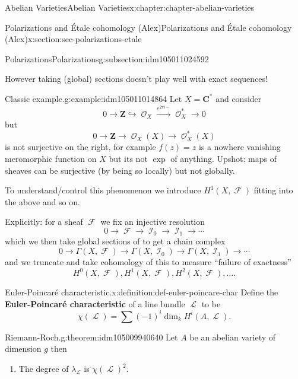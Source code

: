 \documentclass[oneside,10pt,]{book}
\newcommand{\terminology}[1]{\textbf{#1}}
\numberwithin{equation}{section}
\newcommand{\sheaf}[1]{\operatorname{\mathcal{#1}}}
\newcommand{\ZZ}{\mathbf{Z}}
\newcommand{\CC}{\mathbf{C}}
\begin{document}
\begin{chapterptx}{Abelian Varieties}{}{Abelian Varieties}{}{}{x:chapter:chapter-abelian-varieties}
\begin{sectionptx}{Polarizations and Étale cohomology (Alex)}{}{Polarizations and Étale cohomology (Alex)}{}{}{x:section:sec-polarizations-etale}
\begin{subsectionptx}{Polarizations}{}{Polarizations}{}{}{g:subsection:idm105011024592}
\par
However taking (global) sections doesn't play well with exact sequences!%
\begin{example}{Classic example.}{g:example:idm105011014864}%
Let \(X = \CC^*\) and consider%
\begin{equation*}
0 \to \ZZ \hookrightarrow \sheaf O_X \xrightarrow{e^{2\pi i -}} \sheaf O_X^* \to 0
\end{equation*}
but%
\begin{equation*}
0 \to \ZZ \to \sheaf O_X(X) \to \sheaf O_X^*(X)
\end{equation*}
is not surjective on the right, for example \(f(z) = z\) is a nowhere vanishing meromorphic function on \(X\) but its not \(\exp\) of anything. Upshot: maps of sheaves can be surjective (by being so locally) but not globally.%
\end{example}
To understand\slash{}control this phenomenon we introduce \(H^1(X, \sheaf F)\) fitting into the above and so on.%
\par
Explicitly: for a sheaf \(\sheaf F\) we fix an injective resolution%
\begin{equation*}
0\to \sheaf F \to \sheaf I_0 \to \sheaf I_1 \to \cdots
\end{equation*}
which we then take global sections of to get a chain complex%
\begin{equation*}
0\to \Gamma(X,\sheaf F) \to \Gamma(X,\sheaf I_0) \to \Gamma(X,\sheaf I_1) \to \cdots
\end{equation*}
and we truncate and take cohomology of this to measure ``failure of exactness''%
\begin{equation*}
H^0(X, \sheaf F) , H^1(X, \sheaf F) , H^2(X, \sheaf F) , \ldots\text{.}
\end{equation*}
%
\begin{definition}{Euler-Poincaré characteristic.}{x:definition:def-euler-poincare-char}%
Define the \terminology{Euler-Poincaré characteristic} of a line bundle \(\sheaf L\) to be%
\begin{equation*}
\chi(\sheaf L) = \sum (-1)^i \dim_k H^i(A,\sheaf L)\text{.}
\end{equation*}
%
\end{definition}
\begin{theorem}{Riemann-Roch.}{}{g:theorem:idm105009940640}%
Let \(A\) be an abelian variety of dimension \(g\) then%
\begin{enumerate}
\item{}The degree of \(\lambda_{\sheaf L}\) is \(\chi(\sheaf L)^2\).%

\end{enumerate}
\end{theorem}
\end{subsectionptx}
\end{sectionptx}
\end{chapterptx}
\end{document}
